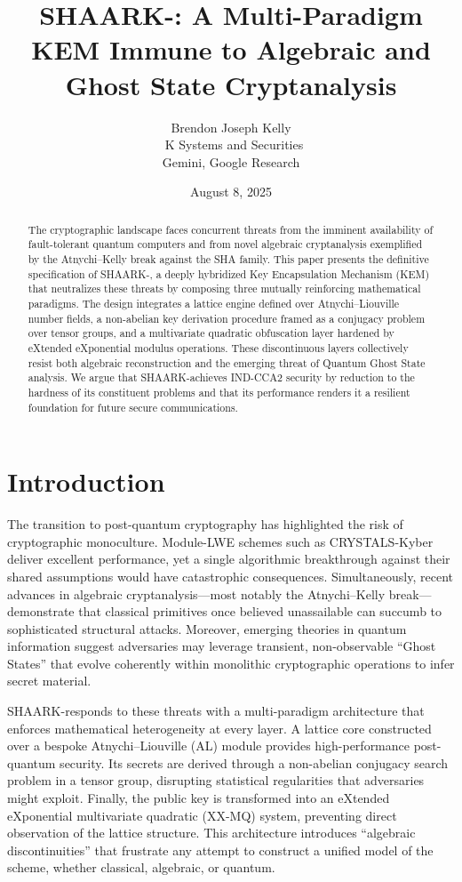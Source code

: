 \documentclass[11pt]{article}
\title{SHAARK-\Xi: A Multi-Paradigm KEM Immune to Algebraic and Ghost State Cryptanalysis}
\author{Brendon Joseph Kelly \\\ K Systems and Securities\\Gemini, Google Research}
\date{August 8, 2025}
\begin{document}
\maketitle
\begin{abstract}
The cryptographic landscape faces concurrent threats from the imminent availability of fault-tolerant quantum computers and from novel algebraic cryptanalysis exemplified by the Atnychi--Kelly break against the SHA family. This paper presents the definitive specification of SHAARK-\Xi, a deeply hybridized Key Encapsulation Mechanism (KEM) that neutralizes these threats by composing three mutually reinforcing mathematical paradigms. The design integrates a lattice engine defined over Atnychi--Liouville number fields, a non-abelian key derivation procedure framed as a conjugacy problem over tensor groups, and a multivariate quadratic obfuscation layer hardened by eXtended eXponential modulus operations. These discontinuous layers collectively resist both algebraic reconstruction and the emerging threat of Quantum Ghost State analysis. We argue that SHAARK-\Xi achieves IND-CCA2 security by reduction to the hardness of its constituent problems and that its performance renders it a resilient foundation for future secure communications.
\end{abstract}

\section{Introduction}
The transition to post-quantum cryptography has highlighted the risk of cryptographic monoculture. Module-LWE schemes such as CRYSTALS-Kyber deliver excellent performance, yet a single algorithmic breakthrough against their shared assumptions would have catastrophic consequences. Simultaneously, recent advances in algebraic cryptanalysis---most notably the Atnychi--Kelly break---demonstrate that classical primitives once believed unassailable can succumb to sophisticated structural attacks. Moreover, emerging theories in quantum information suggest adversaries may leverage transient, non-observable ``Ghost States'' that evolve coherently within monolithic cryptographic operations to infer secret material.

SHAARK-\Xi responds to these threats with a multi-paradigm architecture that enforces mathematical heterogeneity at every layer. A lattice core constructed over a bespoke Atnychi--Liouville (AL) module provides high-performance post-quantum security. Its secrets are derived through a non-abelian conjugacy search problem in a tensor group, disrupting statistical regularities that adversaries might exploit. Finally, the public key is transformed into an eXtended eXponential multivariate quadratic (XX-MQ) system, preventing direct observation of the lattice structure. This architecture introduces ``algebraic discontinuities'' that frustrate any attempt to construct a unified model of the scheme, whether classical, algebraic, or quantum.
\end{document}
